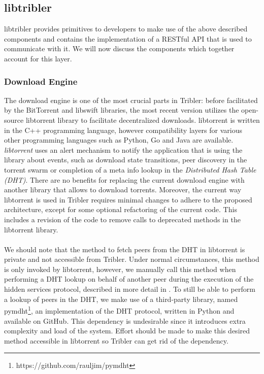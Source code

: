 \subsection{libtribler}
libtribler provides primitives to developers to make use of the above described components and contains the implementation of a RESTful API that is used to communicate with it. We will now discuss the components which together account for this layer.

\subsubsection{\textbf{Download Engine}}
The download engine is one of the most crucial parts in Tribler: before facilitated by the BitTorrent and libswift libraries, the most recent version utilizes the open-source libtorrent library to facilitate decentralized downloads. libtorrent is written in the C++ programming language, however compatibility layers for various other programming languages such as Python, Go and Java are available. \emph{libtorrent} uses an alert mechanism to notify the application that is using the library about events, such as download state transitions, peer discovery in the torrent swarm or completion of a meta info lookup in the \emph{Distributed Hash Table (DHT)}. There are no benefits for replacing the current download engine with another library that allows to download torrents. Moreover, the current way libtorrent is used in Tribler requires minimal changes to adhere to the proposed architecture, except for some optional refactoring of the current code. This includes a revision of the code to remove calls to deprecated methods in the libtorrent library.\\\\
We should note that the method to fetch peers from the DHT in libtorrent is private and not accessible from Tribler. Under normal circumstances, this method is only invoked by libtorrent, however, we manually call this method when performing a DHT lookup on behalf of another peer during the execution of the hidden services protocol, described in more detail in \cite{ruigrok2015bittorrent}. To still be able to perform a lookup of peers in the DHT, we make use of a third-party library, named pymdht\footnote{https://github.com/rauljim/pymdht}, an implementation of the DHT protocol, written in Python and available on GitHub. This dependency is undesirable since it introduces extra complexity and load of the system. Effort should be made to make this desired method accessible in libtorrent so Tribler can get rid of the dependency.

